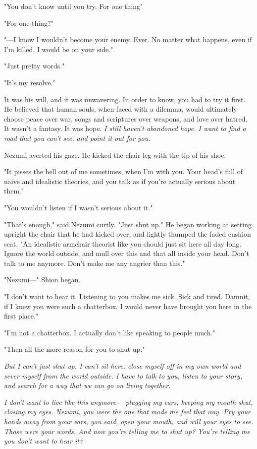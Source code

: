 "You don't know until you try. For one thing\el "

"For one thing?"

"---I know I wouldn't become your enemy. Ever. No matter what happens,
even if I'm killed, I would be on your side."

"Just pretty words."

"It's my resolve."

It was his will, and it was unwavering. In order to know, you had to try
it first. He believed that human souls, when faced with a dilemma, would
ultimately choose peace over war, songs and scriptures over weapons, and
love over hatred. It wasn't a fantasy. It was hope. \emph{I still haven't
abandoned hope. I want to find a road that you can't see, and point it
out for you.}

Nezumi averted his gaze. He kicked the chair leg with the tip of his
shoe.

"It pisses the hell out of me sometimes, when I'm with you. Your head's
full of naive and idealistic theories, and you talk as if you're
actually serious about them."

"You wouldn't listen if I wasn't serious about it."

"That's enough," said Nezumi curtly. "Just shut up." He began working at
setting upright the chair that he had kicked over, and lightly thumped
the faded cushion seat. "An idealistic armchair theorist like you should
just sit here all day long. Ignore the world outside, and mull over this
and that all inside your head. Don't talk to me anymore. Don't make me
any angrier than this."

"Nezumi---" Shion began.

"I don't want to hear it. Listening to you makes me sick. Sick and
tired. Damnit, if I knew you were such a chatterbox, I would never have
brought you here in the first place."

"I'm not a chatterbox. I actually don't like speaking to people much."

"Then all the more reason for you to shut up."

\emph{But I can't just shut up. I can't sit here, close myself off in my own
world and sever myself from the world outside. I have to talk to you,
listen to your story, and search for a way that we can go on living
together.}

\emph{I don't want to live like this anymore--- plugging my ears, keeping my
mouth shut, closing my eyes. Nezumi, you were the one that made me feel
that way. Pry your hands away from your ears, you said, open your mouth,
and will your eyes to see. Those were your words. And now you're telling
me to shut up? You're telling me you don't want to hear it?}

